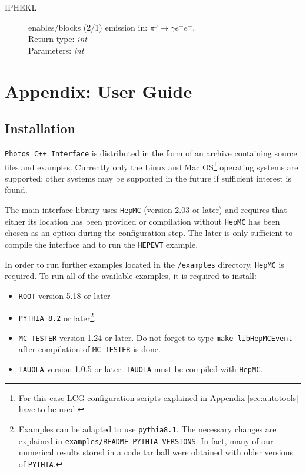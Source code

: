 \documentclass[]{Photos_interface_design}
\begin{document}
\begin{description}
\item[IPHEKL] enables/blocks (2/1) emission in: $\pi^0 \rightarrow \gamma e^+ e^-$. \\
  Return type: \textit{int} \\
  Parameters: \textit{int}
\end{description}

\section{Appendix: User Guide}
\label{sec:User Guide}

\subsection{Installation}
\label{sec:Installation}
 
{\tt Photos C++ Interface} is distributed in the form of an archive containing source files and examples.
Currently only the Linux and Mac OS\footnote{For this case LCG configuration 
scripts explained in Appendix \ref{sec:autotools} have to be used.} operating systems are supported: other systems may be
supported in the future if sufficient interest is found.

The main interface library uses {\tt HepMC} \cite{Dobbs:2001ck} (version 2.03 or later) and requires that either
its location has been provided or compilation without {\tt HepMC} has been chosen as an option during the configuration step.
The later is only sufficient to compile the interface and to run the {\tt HEPEVT} example.

In order to run further examples located in the {\tt /examples} directory, {\tt HepMC} is required.
To run all of the available examples, it is  required to install:

\begin{itemize}
  \item {\tt ROOT} \cite{root-install-www} version 5.18 or later
  \item {\tt PYTHIA 8.2} \cite{Sjostrand:2007gs} or later\footnote{
        Examples can be adapted to use {\tt pythia8.1}. The necessary changes are explained in {\tt examples/README-PYTHIA-VERSIONS}. In fact, many of our numerical results stored in a code tar ball were obtained with older versions of 
{\tt PYTHIA}.}.
  \item {\tt MC-TESTER} \cite{Golonka:2002rz,Davidson:2008ma} version 1.24 or later.
        Do not forget to type {\tt make libHepMCEvent} after compilation of {\tt MC-TESTER} is done.
  \item {\tt TAUOLA} \cite{Davidson:2010rw} version 1.0.5 or later. {\tt TAUOLA} must be compiled with {\tt HepMC}.
\end{itemize}
\end{document}
